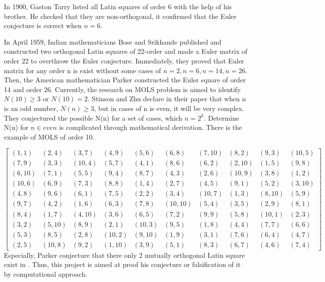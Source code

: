 \documentclass[12pt]{article}
\begin{document}
In 1900, Gaston Tarry listed all Latin squares of order 6 with the help of his brother. He checked that they are non-orthogonal, it confirmed that the Euler conjecture is correct when $n = 6$.

In April 1959, Indian mathematicians Bose and Srikhande published \cite{ref10} and constructed two orthogonal Latin squares of 22-order and made a Euler matrix of order 22 to overthrow the Euler conjecture. Immediately, they proved that Euler matrix for any order n is exist without some cases of $n = 2, n = 6, n = 14, n = 26$. Then, the American mathematician Parker constructed the Euler square of order 14 and order 26.
Currently, the research on MOLS problem is aimed to identify $N(10)\ge 3$ or $N(10)= 2$. Stinson and Zhu declare in their paper\cite{ref12} that when n is an odd number, $N(n)\ge 3$, but in cases of n is even, it will be very complex. They conjectured the possible N(n) for a set of cases, which $n = 2^k$. Determine N(n) for $n \in even$ is complicated through mathematical derivation.
There is the example of MOLS of order 10. 

\[ \begin{bmatrix}(1,1)&(2,4)&(3,7)&(4,9)&(5,6)&(6,8)&(7,10)&(8,2)&(9,3)&(10,5)\\
                  (7,9)&(3,3)&(10,4)&(5,7)&(4,1)&(8,6)&(6,2)&(2,10)&(1,5)&(9,8)\\
                  (6,10)&(7,1)&(5,5)&(9,4)&(8,7)&(4,3)&(2,6)&(10,9)&(3,8)&(1,2)\\
                  (10,6)&(6,9)&(7,3)&(8,8)&(1,4)&(2,7)&(4,5)&(9,1)&(5,2)&(3,10)\\
                  (4,8)&(9,6)&(6,1)&(7,5)&(2,2)&(3,4)&(10,7)&(1,3)&(8,10)&(5,9)\\
                  (9,7)&(4,2)&(1,6)&(6,3)&(7,8)&(10,10)&(5,4)&(3,5)&(2,9)&(8,1)\\
                  (8,4)&(1,7)&(4,10)&(3,6)&(6,5)&(7,2)&(9,9)&(5,8)&(10,1)&(2,3)\\
                  (3,2)&(5,10)&(8,9)&(2,1)&(10,3)&(9,5)&(1,8)&(4,4)&(7,7)&(6,6)\\
                  (5,3)&(8,5)&(2,8)&(10,2)&(9,10)&(1,9)&(3,1)&(7,6)&(6,4)&(4,7)\\ 
                  (2,5)&(10,8)&(9,2)&(1,10)&(3,9)&(5,1)&(8,3)&(6,7)&(4,6)&(7,4)\end{bmatrix} \]
Especially, Parker conjecture that there only 2 mutually orthogonal Latin square exist in \cite{ref13}. Thus, this project is aimed at proof his conjecture or falsification of it by computational approach.
\end{document}
